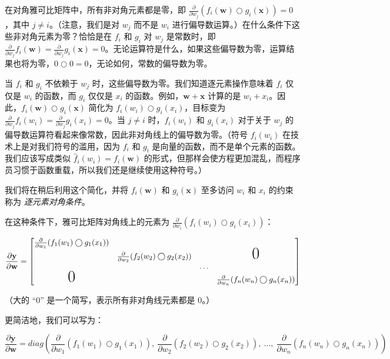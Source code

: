 \documentclass[lang=cn,newtx,10pt,scheme=chinese]{elegantbook}
\begin{document}
在对角雅可比矩阵中，所有非对角元素都是零，即 $\frac{\partial}{\partial w_j} ( f_i(\mathbf{w}) \bigcirc g_i(\mathbf{x}) ) = 0$，其中 $j \neq i$。（注意，我们是对 $w_j$ 而不是 $w_i$ 进行偏导数运算。）在什么条件下这些非对角元素为零？恰恰是在 $f_i$ 和 $g_i$ 对 $w_j$ 是常数时，即 $\frac{\partial}{\partial w_j} f_i(\mathbf{w}) = \frac{\partial}{\partial w_j} g_i(\mathbf{x}) = 0$。无论运算符是什么，如果这些偏导数为零，运算结果也将为零，$0 \bigcirc 0 = 0$，无论如何，常数的偏导数为零。

当 $f_i$ 和 $g_i$ 不依赖于 $w_j$ 时，这些偏导数为零。我们知道逐元素操作意味着 $f_i$ 仅仅是 $w_i$ 的函数，而 $g_i$ 仅仅是 $x_i$ 的函数。例如，$\mathbf{w}+\mathbf{x}$ 计算的是 $w_i + x_i$。因此，$f_i(\mathbf{w}) \bigcirc g_i(\mathbf{x})$ 简化为 $f_i(w_i) \bigcirc g_i(x_i)$，目标变为 $\frac{\partial}{\partial w_j} f_i(w_i) = \frac{\partial}{\partial w_j} g_i(x_i) = 0$。当 $j \neq i$ 时，$f_i(w_i)$ 和 $g_i(x_i)$ 对于关于 $w_j$ 的偏导数运算符看起来像常数，因此非对角线上的偏导数为零。（符号 $f_i(w_i)$ 在技术上是对我们符号的滥用，因为 $f_i$ 和 $g_i$ 是向量的函数，而不是单个元素的函数。我们应该写成类似 $\hat f_{i}(w_i) = f_{i}(\mathbf{w})$ 的形式，但那样会使方程更加混乱，而程序员习惯于函数重载，所以我们还是继续使用这种符号。）

我们将在稍后利用这个简化，并将 $f_i(\mathbf{w})$ 和 $g_i(\mathbf{x})$ 至多访问 $w_i$ 和 $x_i$ 的约束称为 {\em 逐元素对角条件}。

在这种条件下，雅可比矩阵对角线上的元素为 $\frac{\partial}{\partial w_i} ( f_i(w_i) \bigcirc g_i(x_i) )$：

\[\frac{\partial \mathbf{y}}{\partial \mathbf{w}}  = \begin{bmatrix}
\frac{\partial}{\partial w_1} ( f_{1}(w_1) \bigcirc g_{1}(x_1) )\\
& \frac{\partial}{\partial w_2} (f_{2}(w_2) \bigcirc g_{2}(x_2) ) & & \text{\huge0}\\
& & \ldots \\
\text{\huge0}& & & \frac{\partial}{\partial w_n} (f_{n}(w_n) \bigcirc g_{n}(x_n) )
\end{bmatrix}\]

（大的 ``0'' 是一个简写，表示所有非对角线元素都是 0。）

更简洁地，我们可以写为：

\[\frac{\partial \mathbf{y}}{\partial \mathbf{w}} = diag \left( \frac{\partial}{\partial w_1}(f_{1}(w_1) \bigcirc g_{1}(x_1)),~ \frac{\partial}{\partial w_2}(f_{2}(w_2) \bigcirc g_{2}(x_2)),~ \ldots,~ \frac{\partial}{\partial w_n}(f_{n}(w_n) \bigcirc g_{n}(x_n)) \right)\]
\end{document}
